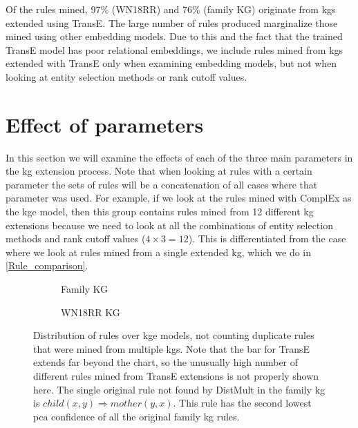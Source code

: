 Of the rules mined, 97\% (WN18RR) and 76\% (family KG) originate from \glspl{kg} extended using TransE. The large number of rules produced marginalize those mined using other embedding models. Due to this and the fact that the trained TransE model has poor relational embeddings, we include rules mined from \glspl{kg} extended with TransE only when examining embedding models, but not when looking at entity selection methods or rank cutoff values.






\section{Effect of parameters}
In this section we will examine the effects of each of the three main parameters in the \gls{kg} extension process. Note that when looking at rules with a certain parameter the sets of rules will be a concatenation of all cases where that parameter was used. For example, if we look at the rules mined with ComplEx as the \gls{kge} model, then this group contains rules mined from 12 different \gls{kg} extensions because we need to look at all the combinations of entity selection methods and rank cutoff values ($4\times3=12$). This is differentiated from the case where we look at rules mined from a single extended \gls{kg}, which we do in \cref{Rule_comparison}.

\begin{figure}[htbp]
\centering
\begin{subfigure}{1\textwidth}
  \centering
  
  \caption{Family KG}
  \label{rule_dist_models_hbar_family}
\end{subfigure}%
\hfill
\begin{subfigure}{1\textwidth}
  \centering
  
  \caption{WN18RR KG}
  \label{rule_dist_models_hbar_wn18rr}
\end{subfigure}
\caption[Rules and their types over KGE models]{Distribution of rules over \gls{kge} models, not counting duplicate rules that were mined from multiple \glspl{kg}. Note that the bar for TransE extends far beyond the chart, so the unusually high number of different rules mined from TransE extensions is not properly shown here. The single original rule not found by DistMult in the family \gls{kg} is $child(x, y) \Rightarrow mother(y,x)$. This rule has the second lowest \gls{pca} confidence of all the original family \gls{kg} rules.}
\label{rule_dist_models_hbar}
\end{figure}

